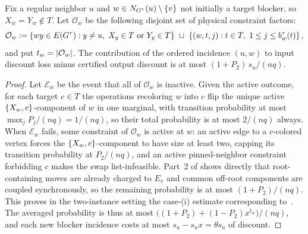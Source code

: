 \begin{lemma}\label{lem:cv-incidence}
Fix a regular neighbor $u$ and $w\in N_{G^\tau}(u)\setminus\left\{v\right\}$ not initially
a target blocker, so \(X_w=Y_w\notin T\).  Let \(\mathcal O_w\) be the
following disjoint set of physical constraint factors:
\[
 \mathcal O_w:=
 \left\{wy\in E(G^\tau):y\ne u,\
       X_y\in T\ \text{or}\ Y_y\in T\right\}
 \ \sqcup\
 \left\{(w,t,j):t\in T,\ 1\le j\le b_w^\tau(t)\right\} ,
\]
and put \(t_w=\left|\mathcal O_w\right|\). The contribution of the
ordered incidence $(u,w)$ to input discount loss minus certified output discount
is at most $(1+P_2)\,s_u/(nq)$.
\end{lemma}

\begin{proof}
Let \(\mathcal E_w\) be the event that all of \(\mathcal O_w\) is inactive. Given the
active outcome, for each target $c\in T$ the operations recoloring $w$
into $c$ flip the unique active $\left\{X_w,c\right\}$-component of $w$ in one
marginal, with transition probability at most $\max_jP_j/(nq)=1/(nq)$,
so their total probability is at most $2/(nq)$
always. When \(\mathcal E_w\) fails, some constraint of \(\mathcal O_w\) is active at
$w$: an active edge to a $c$-colored vertex forces the
$\left\{X_w,c\right\}$-component to have size at least two, capping its transition
probability at $P_2/(nq)$, and an active pinned-neighbor constraint
forbidding $c$ makes the swap list-infeasible. Part~2 of
\Cref{lem:cv-component-budgets} shows directly that root-containing moves
are already charged to $E_v$ and common off-root components are coupled synchronously,
so the remaining probability is at most $(1+P_2)/(nq)$. This proves in the
two-instance setting the case-(i) estimate corresponding
to~\cite[\S4.3]{CarlsonVigoda2024}. The averaged probability is thus at most
\(\bigl((1+P_2)+(1-P_2)x^{t_w}\bigr)/(nq)\), and each new blocker incidence costs at most
$s_u-s_ux=\theta s_u$ of discount.


\end{proof}

